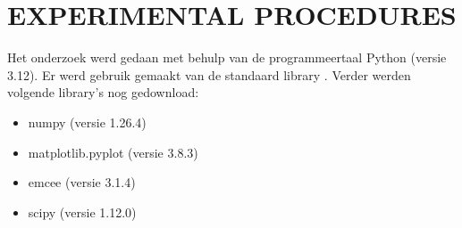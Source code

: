 \section{EXPERIMENTAL PROCEDURES}
Het onderzoek werd gedaan met behulp van de programmeertaal Python (versie 3.12). Er werd gebruik gemaakt van de standaard library \cite{unknown-author-no-date-python}. Verder werden volgende library's nog gedownload:
\begin{itemize}
    \item numpy (versie 1.26.4)
    \item matplotlib.pyplot (versie 3.8.3)
    \item emcee (versie 3.1.4)
    \item scipy (versie 1.12.0)
\end{itemize}
